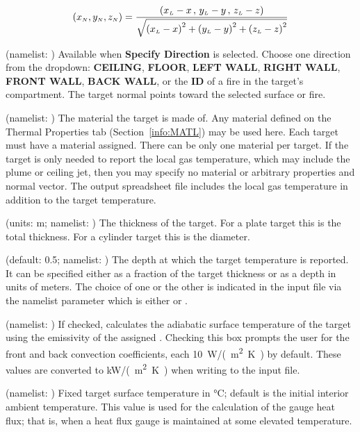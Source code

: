 {{\begin{description}
\begin{equation}
(x_{\scriptscriptstyle N}, y_{\scriptscriptstyle N}, z_{\scriptscriptstyle N} ) = \frac{ (x_{\scriptscriptstyle L}-x \, , \, y_{\scriptscriptstyle L}-y \, , \, z_{\scriptscriptstyle L}-z)}{\sqrt{{ \left( {x_{\scriptscriptstyle L} - x} \right) }^2 + { \left( {y_{\scriptscriptstyle L} - y} \right) }^2 + { \left( {z_{\scriptscriptstyle L} - z} \right) }^2}}
\end{equation}
\item[Surface Orientation] (namelist: ) Available when \textbf{Specify Direction} is selected. Choose one direction from the dropdown: \textbf{CEILING}, \textbf{FLOOR}, \textbf{LEFT WALL}, \textbf{RIGHT WALL}, \textbf{FRONT WALL}, \textbf{BACK WALL}, or the \textbf{ID} of a fire in the target's compartment. The target normal points toward the selected surface or fire.
\item[Material] (namelist: ) The material the target is made of. Any material defined on the Thermal Properties tab (Section~\ref{info:MATL}) may be used here. Each target must have a material assigned. There can be only one material per target. If the target is only needed to report the local gas temperature, which may include the plume or ceiling jet, then you may specify no material or arbitrary properties and normal vector. The output spreadsheet file includes the local gas temperature in addition to the target temperature.
\item[Thickness] (units: \unit{m}; namelist: ) The thickness of the target. For a plate target this is the total thickness. For a cylinder target this is the diameter.
\item[Internal Temperature at] (default: 0.5; namelist: ) The depth at which the target temperature is reported. It can be specified either as a fraction of the target thickness or as a depth in units of meters. The choice of one or the other is indicated in the input file via the namelist parameter   which is either  or .
\item[Adiabatic] (namelist: ) If checked, calculates the adiabatic surface temperature of the target using the emissivity of the assigned . Checking this box prompts the user for the front and back convection coefficients, each 10~\unit{W/(m^2.K)} by default. These values are converted to \unit{kW/(m^2.K)} when writing  to the input file.
\item[Surface Temperature] (namelist: ) Fixed target surface temperature in \unit{\degreeCelsius}; default is the initial interior ambient temperature. This value is used for the calculation of the gauge heat flux; that is, when a heat flux gauge is maintained at some elevated temperature.
\end{description}


}}
